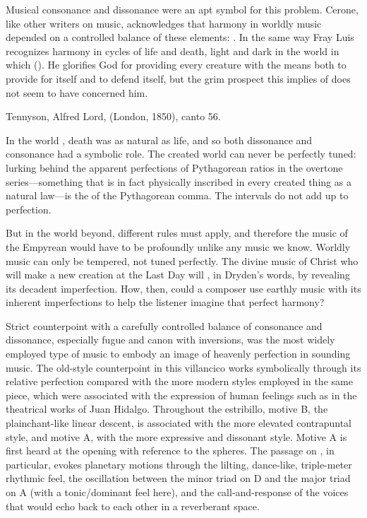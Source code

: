 Musical consonance and dissonance were an apt symbol for this problem.
Cerone, like other writers on music, acknowledges that harmony in worldly music
depended on a controlled balance of these elements: .%
    \Autocite[616]{Cerone:Melopeo}
In the same way Fray Luis recognizes harmony in cycles of life and death, light
and dark in the world in which  ().%
    \Autocite[191]{LuisdeGranada:Simbolo}
He glorifies God for providing every creature with the means both to provide
for itself and to defend itself, but the grim prospect this implies of
 does not seem to have concerned him.%
\begin{Footnote}
    Tennyson, Alfred Lord,  (London, 1850), canto
    56.
\end{Footnote}
In the world , death was as natural as life, and so both
dissonance and consonance had a symbolic role.
The created world can never be perfectly tuned: lurking behind the apparent
perfections of Pythagorean ratios in the overtone series---something that is in
fact physically inscribed in every created thing as a natural law---is the
 of the Pythagorean comma.
The intervals do not add up to perfection.


But in the world beyond, different rules must apply, and therefore the
music of the Empyrean would have to be profoundly unlike any music we know.
Worldly music can only be tempered, not tuned perfectly.
The divine music of Christ who will make a new creation at the Last Day will
, in Dryden's words, by revealing its decadent
imperfection.
How, then, could a composer use earthly music with its inherent imperfections
to help the listener imagine that perfect harmony?

Strict counterpoint with a carefully controlled balance of consonance and
dissonance, especially fugue and canon with inversions, was the most widely
employed type of music to embody an image of heavenly perfection in sounding
music.
The old-style counterpoint in this villancico works symbolically through its
relative perfection compared with the more modern styles employed in the same
piece, which were associated with the expression of human feelings such as in
the theatrical works of Juan Hidalgo.
Throughout the estribillo, motive B, the plainchant-like linear descent, is
associated with the more elevated contrapuntal style, and motive A, with the
more expressive and dissonant style.
Motive A is first heard at the opening with reference to the spheres.
The passage on , in particular, evokes
planetary motions through the lilting, dance-like, triple-meter rhythmic feel,
the oscillation between the minor triad on D and the major triad on A (with a
tonic/dominant feel here), and the call-and-response of the voices that would
echo back to each other in a reverberant space.

